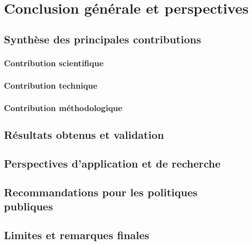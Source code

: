 \chapter*{Conclusion générale et perspectives}

\section{Synthèse des principales contributions}

\subsection{Contribution scientifique}

\subsection{Contribution technique}

\subsection{Contribution méthodologique}

\section{Résultats obtenus et validation}

\section{Perspectives d'application et de recherche}

\section{Recommandations pour les politiques publiques}

\section{Limites et remarques finales}
